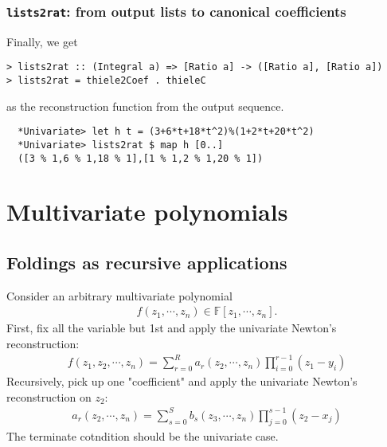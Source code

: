 \documentclass[11pt]{book}
\begin{document}
\subsubsection{\texttt{lists2rat}: from output lists to canonical coefficients}
Finally, we get
\begin{verbatim}
> lists2rat :: (Integral a) => [Ratio a] -> ([Ratio a], [Ratio a])
> lists2rat = thiele2Coef . thieleC
\end{verbatim}
as the reconstruction function from the output sequence.
\begin{verbatim}
  *Univariate> let h t = (3+6*t+18*t^2)%(1+2*t+20*t^2)
  *Univariate> lists2rat $ map h [0..]
  ([3 % 1,6 % 1,18 % 1],[1 % 1,2 % 1,20 % 1])
\end{verbatim}





\section{Multivariate polynomials}

\subsection{Foldings as recursive applications}
Consider an arbitrary multivariate polynomial
\begin{eqnarray}
f(z_1,\cdots, z_n) \in \mathbb{F}[z_1,\cdots, z_n].
\end{eqnarray}
First, fix all the variable but 1st and apply the univariate Newton's reconstruction:
\begin{eqnarray}
f(z_1, z_2, \cdots, z_n) = \sum_{r=0}^R a_r (z_2,\cdots, z_n) \prod_{i=0}^{r-1}(z_1 - y_i)
\end{eqnarray}
Recursively, pick up one "coefficient" and apply the univariate Newton's reconstruction on $z_2$:
\begin{eqnarray}
a_r(z_2, \cdots, z_n) = \sum_{s=0}^{S} b_s (z_3,\cdots, z_n) \prod_{j=0}^{s-1}(z_2 - x_j)
\end{eqnarray}
The terminate cotndition should be the univariate case.
\end{document}

